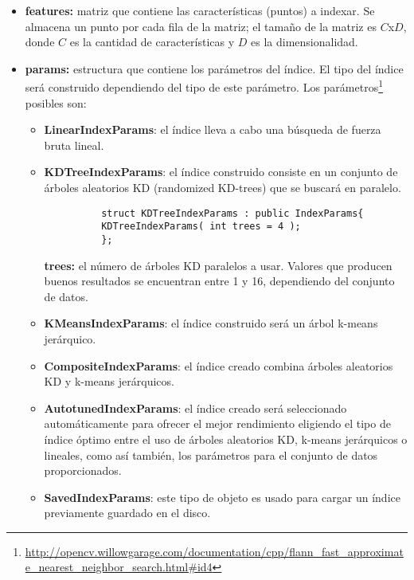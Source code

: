 \documentclass[a4paper,11pt,spanish]{article}
\begin{document}
\begin{itemize}
  \item \textbf{features:} matriz que contiene las características (puntos) a indexar. Se almacena un punto por cada fila de la matriz; el tamaño de la matriz es $C$x$D$, donde $C$ es la cantidad de caracter\'isticas y $D$ es la dimensionalidad.
  \item \textbf{params:} estructura que contiene los parámetros del índice. El tipo del índice será construido dependiendo del tipo de este parámetro. Los parámetros\footnote{\url{http://opencv.willowgarage.com/documentation/cpp/flann_fast_approximate_nearest_neighbor_search.html#id4}} posibles son:
  \begin{itemize}
    \item \textbf{LinearIndexParams}: el índice lleva a cabo una búsqueda de fuerza bruta lineal.
    \item \textbf{KDTreeIndexParams}: el índice construido consiste en un conjunto de árboles aleatorios KD (randomized KD-trees) que se buscará en paralelo.
	\begin{lstlisting}
	      struct KDTreeIndexParams : public IndexParams{
		  KDTreeIndexParams( int trees = 4 );
	      };
	\end{lstlisting}
	\textbf{trees:} el número de árboles KD paralelos a usar. Valores que producen buenos resultados se encuentran entre 1 y 16, dependiendo del conjunto de datos.
    \item \textbf{KMeansIndexParams}: el índice construido será un árbol k-means jerárquico.
    \item \textbf{CompositeIndexParams}: el índice creado combina árboles aleatorios KD y k-means jerárquicos.
    \item \textbf{AutotunedIndexParams}: el índice creado será seleccionado automáticamente para ofrecer el mejor rendimiento eligiendo el tipo de índice óptimo entre el uso de árboles aleatorios KD, k-means jerárquicos o lineales, como así también, los parámetros para el conjunto de datos proporcionados.
    \item \textbf{SavedIndexParams}: este tipo de objeto es usado para cargar un índice previamente guardado en el disco.
  \end{itemize}
\end{itemize}
\end{document}
